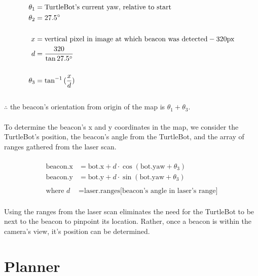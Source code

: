 \documentclass[titlepage,12pt,a4paper]{article}
\begin{document}
\begin{align*}
	\theta_1   &=  \text{TurtleBot's current yaw, relative to start} \\
	\theta_2   &=  27.5\degree \\
	\\
	x 	        &=  \text{vertical pixel in image at which beacon was detected} - 320\text{px} \\
	d 	        &=  \frac{320}{\tan{27.5\degree}} \\ 
	\\
	\theta_3   &= \tan^{-1}{(\frac{x}{d})}
\end{align*}
\\
$\therefore$ the beacon's orientation from origin of the map is $\theta_1 + \theta_3$. \\
\\
To determine the beacon's x and y coordinates in the map, we consider the TurtleBot's position, the beacon's angle from the TurtleBot, and the array of ranges gathered from the laser scan. \\
\\
\begin{align*}
	\text{beacon.x}		&=		\text{bot.x} + d \cdot \cos{(\text{bot.yaw} + \theta_3)} \\
	\text{beacon.y} 		&= 		\text{bot.y} + d \cdot \sin{(\text{bot.yaw} + \theta_3)} \\
	\\
	\text{where } d 		&=		\text{laser.ranges[beacon's angle in laser's range]} 
\end{align*}
\\
Using the ranges from the laser scan eliminates the need for the TurtleBot to be next to the beacon to pinpoint its location. Rather, once a beacon is within the camera's view, it's position can be determined. 


\pagebreak


\section*{Planner}
\end{document}
